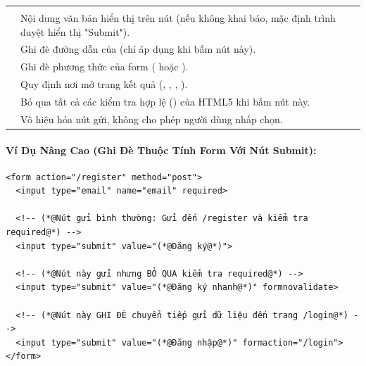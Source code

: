 \begin{prettyTableBox}
\begin{tabularx}{\linewidth}{K{3.0cm} Z Z}
 &  &  \\
 & Nội dung văn bản hiển thị trên nút (nếu không khai báo, mặc định trình duyệt hiển thị "Submit"). &  \\
 & Ghi đè đường dẫn  của  (chỉ áp dụng khi bấm nút này). &  \\
 & Ghi đè phương thức  của form ( hoặc ). &  \\
 & Quy định nơi mở trang kết quả (, , , ). &  \\
 & Bỏ qua tất cả các kiểm tra hợp lệ () của HTML5 khi bấm nút này. &  \\
 & Vô hiệu hóa nút gửi, không cho phép người dùng nhấp chọn. &  \\
\end{tabularx}
\end{prettyTableBox}

\paragraph{Ví Dụ Nâng Cao (Ghi Đè Thuộc Tính Form Với Nút Submit):}

\begin{codeWindow}
\begin{lstlisting}[language=HTML5]
<form action="/register" method="post">
  <input type="email" name="email" required>
  
  <!-- (*@Nút gửi bình thường: Gửi đến /register và kiểm tra required@*) -->
  <input type="submit" value="(*@Đăng ký@*)">
  
  <!-- (*@Nút này gửi nhưng BỎ QUA kiểm tra required@*) -->
  <input type="submit" value="(*@Đăng ký nhanh@*)" formnovalidate>
  
  <!-- (*@Nút này GHI ĐÈ chuyển tiếp gửi dữ liệu đến trang /login@*) -->
  <input type="submit" value="(*@Đăng nhập@*)" formaction="/login">
</form>
\end{lstlisting}
\end{codeWindow}

